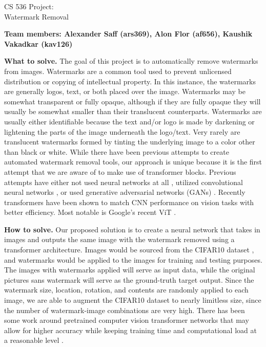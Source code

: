 \documentclass[11pt]{article}
\begin{document}
\begin{center}
\large{CS 536 Project:\\Watermark Removal}\\
\end{center}
\vspace{5mm}

\textbf{Team members: Alexander Saff (ars369), Alon Flor (af656), Kaushik Vakadkar (kav126)}




\begin{sloppypar}
\textbf{What to solve.}
The goal of this project is to automatically remove watermarks from images. Watermarks are a common tool used to prevent unlicensed distribution or copying of intellectual property. In this instance, the watermarks are generally logos, text, or both placed over the image. Watermarks may be somewhat transparent or fully opaque, although if they are fully opaque they will usually be somewhat smaller than their translucent counterparts. Watermarks are usually either identifiable because the text and/or logo is made by darkening or lightening the parts of the image underneath the logo/text. Very rarely are translucent watermarks formed by tinting the underlying image to a color other than black or white. While there have been previous attempts to create automated watermark removal tools, our approach is unique because it is the first attempt that we are aware of to make use of transformer blocks. Previous attempts have either not used neural networks at all \cite{48101}, utilized convolutional neural networks \cite{8579082}, or used generative adversarial networks (GANs) \cite{rickwierenga}. Recently transformers have been shown to match CNN performance on vision tasks with better efficiency. Most notable is Google’s recent ViT \cite{dosovitskiy2020image}.
\end{sloppypar}

\begin{sloppypar}
\textbf{How to solve.} 
Our proposed solution is to create a neural network that takes in images and outputs the same image with the watermark removed using a transformer architecture. Images would be sourced from the CIFAR10 dataset \cite{Krizhevsky2009LearningML}, and watermarks would be applied to the images for training and testing purposes. The images with watermarks applied will serve as input data, while the original pictures sans watermark will serve as the ground-truth target output. Since the watermark size, location, rotation, and contents are randomly applied to each image, we are able to augment the CIFAR10 dataset to nearly limitless size, since the number of watermark-image combinations are very high. There has been some work around pretrained computer vision transformer networks that may allow for higher accuracy while keeping training time and computational load at a reasonable level \cite{chen2020pretrained}.
\end{sloppypar}
\end{document}
